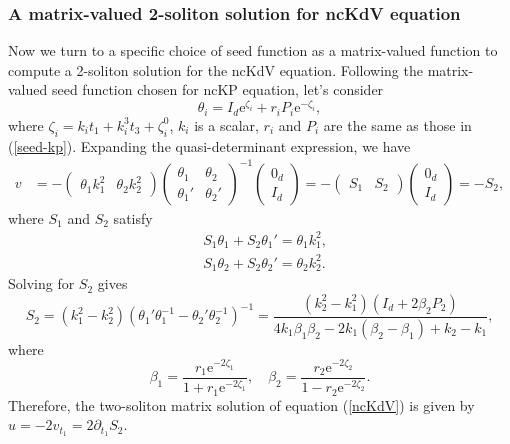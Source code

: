 \documentclass[11p,reqno]{amsart}
\numberwithin{equation}{section}
\numberwithin{equation}{section}
\begin{document}
\subsubsection{A matrix-valued 2-soliton solution for ncKdV equation}
Now we turn to a specific choice of seed function as a matrix-valued function to compute a 2-soliton solution for the ncKdV equation. 
Following the matrix-valued seed function chosen for ncKP equation, let's consider
\[
    \theta_i = I_d \mathrm{e}^{\zeta_i} + r_i P_i \mathrm{e}^{-\zeta_i},
\]
where $\zeta_i = k_i t_1 + k_i^3 t_3 + \zeta_i^0$, $k_i$ is a scalar, $r_i$ and $P_i$ are the same as those in (\ref{seed-kp}). Expanding the quasi-determinant expression, we have
\begin{equation}
    \begin{split}
    v &= -\begin{pmatrix} \theta_1k_1^2& \theta_2k_2^2 \end{pmatrix}  \begin{pmatrix} \theta_1&\theta_2 \\\theta_1'&\theta_2'\end{pmatrix}^{-1} \begin{pmatrix} 0_d \\ I_d \end{pmatrix} = - \begin{pmatrix} S_1 & S_2 \end{pmatrix} \begin{pmatrix} 0_d \\ I_d \end{pmatrix} = - S_2,
    \end{split}
\end{equation}
where $S_1$ and $S_2$ satisfy
\begin{equation}
    \begin{split}
        &S_1\theta_1+S_2\theta_1'=\theta_1k_1^2, \\
        &S_1\theta_2+S_2\theta_2'=\theta_2k_2^2.
    \end{split}
\end{equation}
Solving for $S_2$ gives
\begin{equation}
    S_2 =(k_1^2-k_2^2)(\theta_1'\theta_1^{-1}-\theta_2'\theta_2^{-1})^{-1}= \frac{(k_2^2-k_1^2)(I_d+2\beta_2P_2)}{4k_1\beta_1\beta_2-2k_1(\beta_2-\beta_1) + k_2-k_1},
\end{equation}
where 
\begin{equation}
    \beta_1 = \frac{r_1 \mathrm{e}^{-2\zeta_1}}{1+r_1 \mathrm{e}^{-2\zeta_1}}, \quad \beta_2 = \frac{r_2 \mathrm{e}^{-2\zeta_2}}{1-r_2 \mathrm{e}^{-2\zeta_2}}. 
\end{equation}
Therefore, the two-soliton matrix solution of equation (\ref{ncKdV}) is given by $u = -2v_{t_1} = 2 \partial_{t_1} S_2$.
\end{document}
